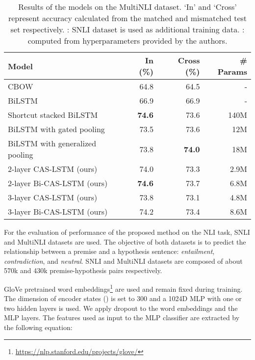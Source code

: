 \documentclass[wcp]{jmlr}
\begin{document}
    \begin{table*}[t]
        \centering
        \begin{tabular}{l r r r}
            \hline
            \bf{Model} & \bf{In (\%)} & \bf{Cross (\%)} & \bf{\# Params} \\
            \hline
            CBOW \citep{williams2018mnli} & 64.8 & 64.5 & - \\
            BiLSTM \citep{williams2018mnli} & 66.9 & 66.9 & - \\
            Shortcut stacked BiLSTM \citep{nie2017shortcut} & \bf{74.6} & 73.6 & 140M \\
            BiLSTM with gated pooling \citep{chen2017gated} & 73.5 & 73.6 & 12M \\
            BiLSTM with generalized pooling \citep{chen2018generalized} & 73.8 & \bf{74.0} & 18M \\
            \hline
            2-layer CAS-LSTM (ours) & 74.0 & 73.3 & 2.9M \\
            2-layer Bi-CAS-LSTM (ours) & \bf{74.6} & 73.7 & 6.8M \\
            3-layer CAS-LSTM (ours) & 73.8 & 73.1 & 4.8M \\
            3-layer Bi-CAS-LSTM (ours) & 74.2 & 73.4 & 8.6M \\
            \hline
        \end{tabular}
        \caption{Results of the models on the MultiNLI dataset.
            `In' and `Cross' represent accuracy calculated from the matched and mismatched test set respectively.
            : SNLI dataset is used as additional training data. : computed from hyperparameters provided by the authors.}
        \label{table:mnli}
    \end{table*}
    
    For the evaluation of performance of the proposed method on the NLI task, SNLI \citep{bowman2015snli} and MultiNLI \citep{williams2018mnli} datasets are used.
    The objective of both datasets is to predict the relationship between a premise and a hypothesis sentence: \textit{entailment}, \textit{contradiction}, and \textit{neutral}.
    SNLI and MultiNLI datasets are composed of about 570k and 430k premise-hypothesis pairs respectively.
    
    GloVe pretrained word embeddings\footnote{\url{https://nlp.stanford.edu/projects/glove/}} \citep{pennington2014glove} are used and remain fixed during training.
    The dimension of encoder states () is set to 300 and a 1024D MLP with one or two hidden layers is used.
    We apply dropout \citep{srivastava2014dropout} to the word embeddings and the MLP layers.
    The features used as input to the MLP classifier are extracted by the following equation:
    
\end{document}
